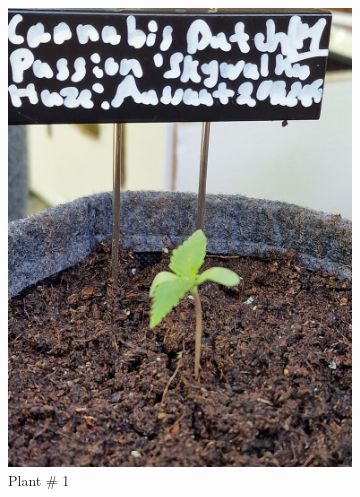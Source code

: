 \begin{figure}[htbp]
    \begin{subfigure}[t]{.19\textwidth}
        \includegraphics[width=\linewidth]{plant_01_2024-05-13}
        \caption{Plant \# 1}
        \label{fig:plant_01_2024-05-13}
    \end{subfigure}
    \begin{subfigure}[t]{.19\textwidth}

\end{subfigure}
\end{figure}
